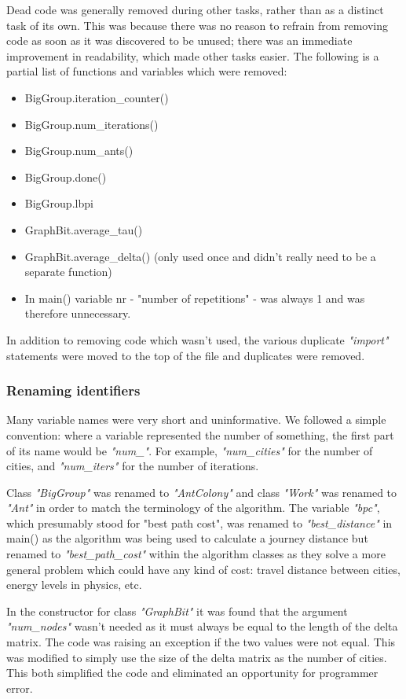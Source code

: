 \documentclass[11pt, oneside]{article}   %
\begin{document}
Dead code was generally removed during other tasks, rather than as a distinct task of its own.
This was because there was no reason to refrain from removing code as soon as it was discovered to be unused; there was an immediate improvement in readability, which made other tasks easier.
The following is a partial list of functions and variables which were removed:
\begin{itemize}
\item BigGroup.iteration\_counter()
\item BigGroup.num\_iterations()
\item BigGroup.num\_ants()
\item BigGroup.done()
\item BigGroup.lbpi
\item GraphBit.average\_tau()
\item GraphBit.average\_delta() (only used once and didn't really need to be a separate function)
\item In main() variable nr - "number of repetitions" - was always 1 and was therefore unnecessary.
\end{itemize}

In addition to removing code which wasn't used, the various duplicate {\em "import"} statements were moved to the top of the file and duplicates were removed.

\subsubsection{Renaming identifiers}

Many variable names were very short and uninformative.
We followed a simple convention: where a variable represented the number of something, the first part of its name would be {\em "num\_"}.
For example, {\em "num\_cities"} for the number of cities, and {\em "num\_iters"} for the number of iterations.

Class {\em "BigGroup"} was renamed to {\em "AntColony"} and class {\em "Work"} was renamed to {\em "Ant"} in order to match the terminology of the algorithm.
The variable {\em "bpc"}, which presumably stood for "best path cost", was renamed to {\em "best\_distance"} in main() as the algorithm was being used to calculate a journey distance but renamed to {\em "best\_path\_cost"} within the algorithm classes as they solve a more general problem which could have any kind of cost: travel distance between cities, energy levels in physics, etc.

In the constructor for class {\em "GraphBit"} it was found that the argument {\em "num\_nodes"} wasn't needed as it must always be equal to the length of the delta matrix.
The code was raising an exception if the two values were not equal.
This was modified to simply use the size of the delta matrix as the number of cities.
This both simplified the code and eliminated an opportunity for programmer error.
\end{document}
